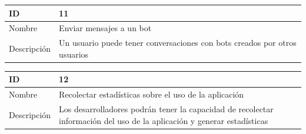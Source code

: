 \begin{center}
\begin{tabular}{|p{}|p{}|}
\hline
\textbf{ID} & 11\\
\hline
Nombre & Enviar mensajes a un bot\\
\hline
Descripción & Un usuario puede tener conversaciones con bots creados por otros usuarios \\
\hline
\end{tabular}
\vspace{2mm}

\begin{tabular}{|p{}|p{}|}
\hline
\textbf{ID} & 12\\
\hline
Nombre & Recolectar estadísticas sobre el uso de la aplicación\\
\hline
Descripción & Los desarrolladores podrán tener la capacidad de recolectar información del uso de la aplicación y generar estadísticas\\
\hline
\end{tabular}
\end{center}

